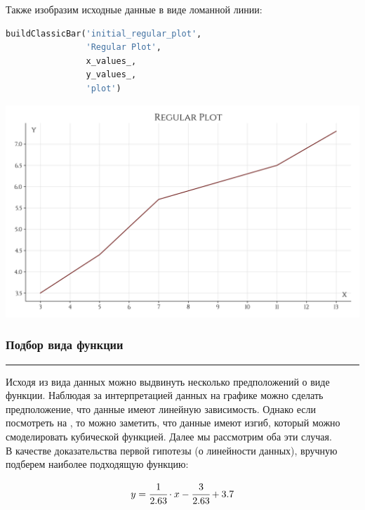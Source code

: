 \documentclass[a4paper, 14pt]{extarticle}
\begin{document}
Также изобразим исходные данные в виде ломанной линии:

\begin{center}
    \begin{lstlisting}[language=Python]
buildClassicBar('initial_regular_plot', 
                'Regular Plot', 
                x_values_, 
                y_values_, 
                'plot')
    \end{lstlisting}
\end{center}

\begin{center}
    \includegraphics[width=1\textwidth, height=0.5\textheight, keepaspectratio]{initial_regular_plot} \\
\end{center}

\subsubsection*{{Подбор вида функции}}\vspace{-20pt}\rule{\linewidth}{0.1mm}

Исходя из вида данных можно выдвинуть несколько предположений о виде функции. Наблюдая за 
интерпретацией данных на графике  можно сделать предположение, что данные 
имеют линейную зависимость. Однако если посмотреть на , то можно 
заметить, что данные имеют изгиб, который можно смоделировать кубической функцией. Далее 
мы рассмотрим оба эти случая.\\

В качестве доказательства первой гипотезы (о линейности данных), вручную подберем наиболее 
подходящую функцию:

\begin{equation*}
    y = \cfrac{1}{2.63} \cdot x - \cfrac{3}{2.63} + 3.7
\end{equation*}
\end{document}
